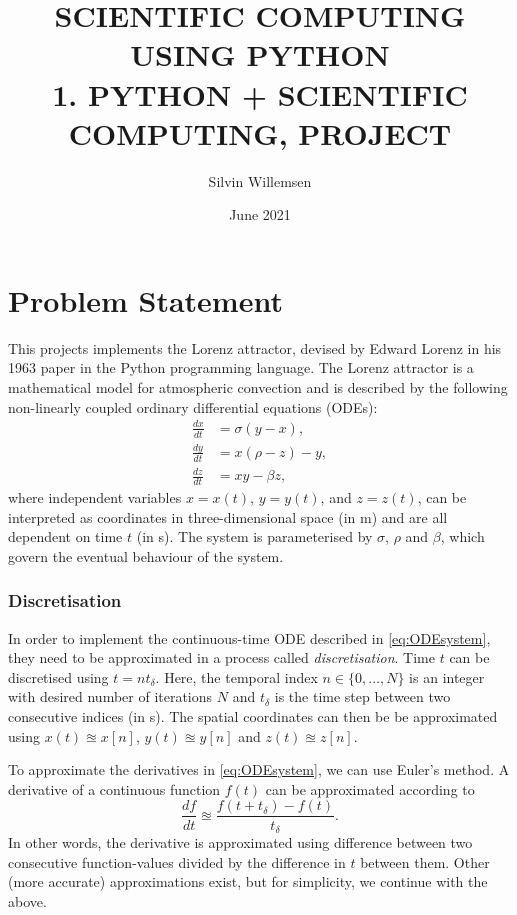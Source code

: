 \documentclass{article}
\title{SCIENTIFIC COMPUTING USING PYTHON\\
1. PYTHON + SCIENTIFIC COMPUTING, PROJECT
}
\author{Silvin Willemsen}
\date{June 2021}
\def\td{t_\delta}
\begin{document}
\maketitle

\section{Problem Statement}\label{sec:problemStatement}
This projects implements the Lorenz attractor, devised by Edward Lorenz in his 1963 paper \cite{lorenz} in the Python programming language. The Lorenz attractor is a mathematical model for atmospheric convection and is described by the following non-linearly coupled ordinary differential equations (ODEs):
\begin{subequations}\label{eq:ODEsystem}
    \begin{align}
        \frac{dx}{dt} &= \sigma(y-x),\\
        \frac{dy}{dt} &= x(\rho - z) - y,\\
        \frac{dz}{dt} &= xy - \beta z,
    \end{align}
\end{subequations}
where independent variables $x = x(t)$, $y = y(t)$, and $z = z(t)$, can be interpreted as coordinates in three-dimensional space (in m) and are all dependent on time $t$ (in s). The system is parameterised by $\sigma$, $\rho$ and $\beta$, which govern the eventual behaviour of the system.

\subsubsection*{Discretisation}
In order to implement the continuous-time ODE described in \eqref{eq:ODEsystem}, they need to be approximated in a process called \textit{discretisation}. Time $t$ can be discretised using $t = n \td $. Here, the temporal index $n\in \{0, \hdots, N\}$ is an integer with desired number of iterations $N$ and $\td$ is the time step between two consecutive indices (in s). The spatial coordinates can then be be approximated using $x(t)\approxeq x[n]$, $y(t)\approxeq y[n]$ and $z(t)\approxeq z[n]$. 

To approximate the derivatives in \eqref{eq:ODEsystem}, we can use Euler's method. A derivative of a continuous function $f(t)$ can be approximated according to
\begin{equation}\label{eq:euler}
    \frac{df}{dt} \approxeq \frac{f(t+\td) - f(t)}{\td}.
\end{equation}
In other words, the derivative is approximated using difference between two consecutive function-values divided by the difference in $t$ between them. Other (more accurate) approximations exist, but for simplicity, we continue with the above.
\end{document}
